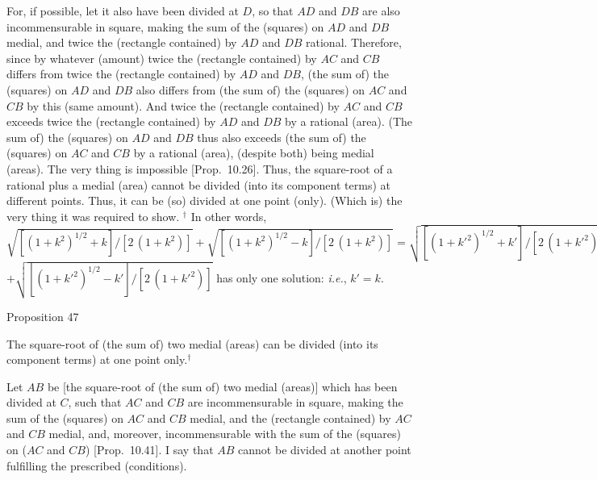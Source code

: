 For, if possible, let it also have been divided at $D$, so that
$AD$ and $DB$ are also incommensurable in square, making the sum of 
the (squares) on $AD$ and $DB$ medial, and twice the (rectangle
contained) by $AD$ and $DB$ rational. Therefore, since by whatever
(amount) twice the (rectangle contained) by $AC$ and $CB$
differs from twice the (rectangle contained) by $AD$ and $DB$, (the sum of) the (squares) on  $AD$ and $DB$ also differs from (the sum of) the
(squares) on
$AC$ and $CB$ by this
(same amount). And twice the (rectangle contained) by $AC$ and $CB$
exceeds twice the (rectangle contained) by $AD$ and $DB$ by a
rational (area). (The sum of) the (squares)
on $AD$ and $DB$ thus also exceeds (the sum of) the (squares) on $AC$ and $CB$ by a rational (area),
(despite both) being medial (areas). The very thing is impossible [Prop.~10.26]. Thus, the square-root of a rational
plus a medial (area) cannot be divided (into its component terms) at different points. Thus, it
can  be (so) divided at one point (only). (Which is) the very thing it was required to
show.
{\footnotesize\noindent$^\dag$ In other words, $\sqrt{[(1+k^2)^{1/2}+k]/[2\,(1+k^2)]} +\sqrt{[(1+k^2)^{1/2}-k]/[2\,(1+k^2)]}=\sqrt{[(1+k'^2)^{1/2}+k']/[2\,(1+k'^2)]}$\\$ +\sqrt{[(1+k'^2)^{1/2}-k']/[2\,(1+k'^2)]}$
has only one solution: {\em i.e.}, $k'=k$.}


\begin{center}
{\large Proposition 47}
\end{center}

The square-root of (the sum of) two medial (areas) can be
divided (into its component terms) at one point only.$^\dag$

\epsfysize=2in
\centerline{}

Let $AB$ be [the square-root of (the sum of) two medial (areas)] which has been divided
at $C$, such that $AC$ and $CB$ are incommensurable in square, making the
sum of the (squares) on $AC$ and $CB$ medial, and the (rectangle contained) by $AC$ and $CB$ medial, and, moreover, incommensurable
with the sum of the (squares) on ($AC$ and $CB$) [Prop.~10.41]. I say that $AB$ cannot be divided
at another point fulfilling the prescribed (conditions).

